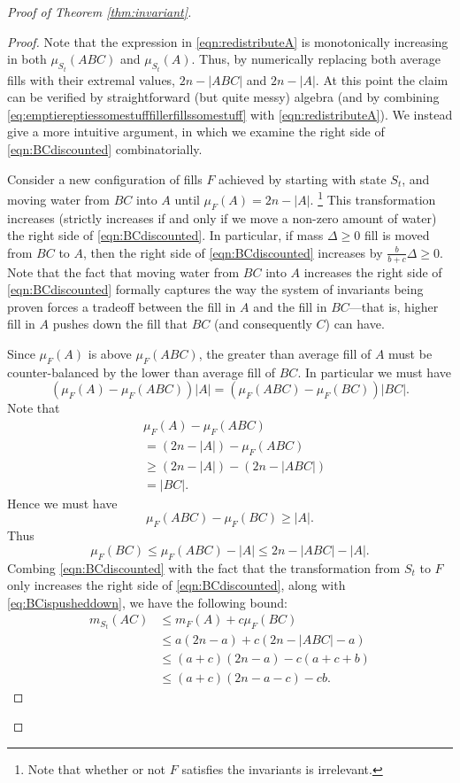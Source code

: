 \documentclass[twocolumn]{article}[10pt]
\begin{document}
\begin{proof}[Proof of Theorem \ref{thm:invariant}]
\begin{proof}
Note that the expression in \eqref{eqn:redistributeA} is monotonically
increasing in both $\mu_{S_t}(ABC)$ and $\mu_{S_t}(A)$. Thus, by numerically
replacing both average fills with their extremal values, $2n-|ABC|$ and
$2n-|A|$. At this point the claim can be verified by straightforward (but quite
messy) algebra (and by combining
\eqref{eq:emptiereptiessomestufffillerfillssomestuff} with
\eqref{eqn:redistributeA}). We instead give a more intuitive argument, in which
we examine the right side of \eqref{eqn:BCdiscounted} combinatorially.

 Consider a new configuration of fills $F$ achieved by starting with state
 $S_t$, and moving water from $BC$ into $A$ until $\mu_{F}(A) = 2n-|A|$.
 \footnote{Note that whether or not $F$ satisfies the invariants is
 irrelevant.} This transformation increases (strictly increases if and only if
 we move a non-zero amount of water) the right side of
 \eqref{eqn:BCdiscounted}. In particular, if mass $\Delta \ge 0$ fill is moved
 from $BC$ to $A$, then the right side of \eqref{eqn:BCdiscounted} increases by
 $\frac{b}{b+c} \Delta \ge 0$. Note that the fact that moving water from $BC$
 into $A$ increases the right side of \eqref{eqn:BCdiscounted} formally
 captures the way the system of invariants being proven forces a tradeoff
 between the fill in $A$ and the fill in $BC$---that is, higher fill in $A$
 pushes down the fill that $BC$ (and consequently $C$) can have.

  Since $\mu_F(A)$ is above $\mu_{F}(ABC)$, the greater than average fill of
  $A$ must be counter-balanced by the lower than average fill of $BC$. In
  particular we must have
  $$(\mu_F(A) - \mu_F(ABC))|A| = (\mu_F(ABC) -\mu_F(BC))|BC|.$$
  Note that 
  \begin{align*}
  & \mu_F(A) -\mu_F(ABC) \\
  &= (2n-|A|) - \mu_F(ABC) \\
  &\ge (2n-|A|) - (2n-|ABC|) \\
  &= |BC|.    
  \end{align*}
  Hence we must have 
  $$\mu_F(ABC) - \mu_F(BC) \ge |A|.$$
  Thus 
  \begin{equation}
      \mu_F(BC) \le \mu_F(ABC) - |A| \le 2n-|ABC| -|A|.
      \label{eq:BCispusheddown}
  \end{equation}
  Combing \eqref{eqn:BCdiscounted} with the fact that the transformation from
  $S_t$ to $F$ only increases the right side of \eqref{eqn:BCdiscounted}, along
  with \eqref{eq:BCispusheddown}, we have the following bound:
  \begin{align}
    m_{S_t}(AC)
  &\le m_{F}(A) + c\mu_{F}(BC) \nonumber \\
  &\le a(2n-a) + c(2n-|ABC|-a) \nonumber \\
  &\le (a+c)(2n-a) - c(a+c+b) \nonumber \\
  &\le (a+c)(2n-a-c) - cb. \label{eq:eqnwithcb}
  \end{align}
  

\end{proof}
\end{proof}
\end{document}
